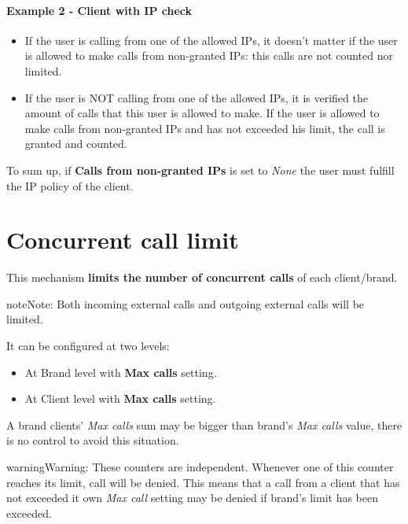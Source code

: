 \documentclass[letterpaper,10pt,english]{sphinxmanual}
\begin{document}
\paragraph{Example 2 - Client with IP check}
\begin{itemize}
\item {} 
If the user is calling from one of the allowed IPs,
it doesn't matter if the user is allowed to make calls from non-granted IPs:
this calls are not counted nor limited.

\item {} 
If the user is NOT calling from one of the allowed IPs, it is verified the
amount of calls that this user is allowed to make. If the user is allowed to
make calls from non-granted IPs and has not exceeded his limit, the call is
granted and counted.

\end{itemize}

To sum up, if \textbf{Calls from non-granted IPs} is set to \emph{None} the user must fulfill the IP policy of the client.


\section{Concurrent call limit}
\label{security_and_maintenance/security/concurrent_call_limit::doc}\label{security_and_maintenance/security/concurrent_call_limit:concurrent-call-limit}
This mechanism \textbf{limits the number of concurrent calls} of each client/brand.

\begin{notice}{note}{Note:}
Both incoming external calls and outgoing external calls will be limited.
\end{notice}

It can be configured at two levels:
\begin{itemize}
\item {} 
At Brand level with \textbf{Max calls} setting.

\item {} 
At Client level with \textbf{Max calls} setting.

\end{itemize}

A brand clients' \emph{Max calls} sum may be bigger than brand's \emph{Max calls} value, there is no control to avoid this situation.

\begin{notice}{warning}{Warning:}
These counters are independent. Whenever one of this counter reaches its limit, call will be denied. This
means that a call from a client that has not exceeded it own \emph{Max call} setting may be denied if brand's
limit has been exceeded.
\end{notice}
\end{document}
